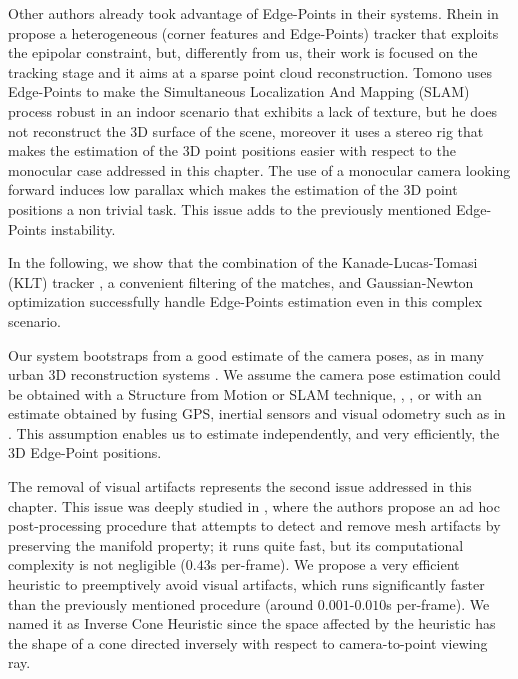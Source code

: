 Other authors \cite{Rhein_et_al13, Tomono09} already took advantage of Edge-Points in their systems. Rhein \etal in \cite{Rhein_et_al13} propose a heterogeneous (corner features and Edge-Points) tracker that exploits the epipolar constraint, but, differently from us, their work is focused on the tracking stage and it aims at a sparse point cloud reconstruction.
Tomono \cite{Tomono09}  uses Edge-Points to make  the Simultaneous Localization And Mapping (SLAM) process robust in an indoor scenario that exhibits a lack of texture, but he does not reconstruct the 3D surface of the scene, moreover it uses a stereo rig that makes the estimation of the 3D point positions easier with respect to the monocular case addressed in this chapter.
The use of a monocular camera looking forward induces low parallax which makes  the estimation of the 3D point positions a non trivial task. This issue adds to the previously mentioned Edge-Points instability. 

In the following, we show that the combination of the  Kanade-Lucas-Tomasi (KLT) tracker \cite{Lucas_Kanade81}, a convenient filtering of the matches, and Gaussian-Newton optimization successfully handle Edge-Points estimation even in this complex scenario. 

Our system bootstraps from a good estimate of the camera poses, as in many urban 3D reconstruction systems \cite{ pollefeys_et_al_08,cornelis_et_al08}. 
We assume the camera pose estimation could be obtained with a Structure from Motion or SLAM technique, \eg, \cite{Snavely_et_al06},  or with an estimate obtained by fusing GPS, inertial sensors and visual odometry such as in \cite{Cucci_Matteucci14}.
This assumption enables us to estimate independently, and very efficiently, the 3D Edge-Point positions.

The removal of visual artifacts represents the second issue addressed in this chapter.
This issue was deeply studied in \cite{litvinov_Lhiuller14}, where the authors propose an ad hoc post-processing procedure that attempts to detect and remove mesh artifacts by preserving the manifold property; it runs quite fast, but its computational complexity is not negligible ($0.43$s per-frame).  
We propose a very efficient heuristic to preemptively avoid visual artifacts, which runs significantly faster than the previously mentioned procedure (around $0.001$-$0.010$s per-frame). 
We named it as Inverse Cone Heuristic since the space affected by the heuristic has the shape of a cone directed inversely with respect to camera-to-point viewing ray.

